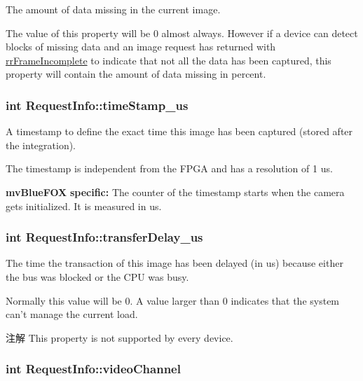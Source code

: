 The amount of data missing in the current image. 

The value of this property will be 0 almost always. However if a device can detect blocks of missing data and an image request has returned with \hyperlink{group___common_interface_ggab6148762ea638f8eabbabfc9468b0d4ca10d87665792fb666a20eda9b076c3164}{rr\+Frame\+Incomplete} to indicate that not all the data has been captured, this property will contain the amount of data missing in percent. \hypertarget{struct_request_info_a29fdb078f00559da9d860360b46d55de}{
\subsubsection[{time\+Stamp\+\_\+us}]{\setlength{\rightskip}{0pt plus 5cm}int Request\+Info\+::time\+Stamp\+\_\+us}}\label{struct_request_info_a29fdb078f00559da9d860360b46d55de}


A timestamp to define the exact time this image has been captured (stored after the integration). 

The timestamp is independent from the F\+P\+G\+A and has a resolution of 1 us.

{\bfseries mv\+Blue\+F\+O\+X} {\bfseries specific\+:} The counter of the timestamp starts when the camera gets initialized. It is measured in us. \hypertarget{struct_request_info_afcc4a35d0065f27e5ab6d90a4499e354}{
\subsubsection[{transfer\+Delay\+\_\+us}]{\setlength{\rightskip}{0pt plus 5cm}int Request\+Info\+::transfer\+Delay\+\_\+us}}\label{struct_request_info_afcc4a35d0065f27e5ab6d90a4499e354}


The time the transaction of this image has been delayed (in us) because either the bus was blocked or the C\+P\+U was busy. 

Normally this value will be 0. A value larger than 0 indicates that the system can't manage the current load.

\begin{DoxyNote}{注解}
This property is not supported by every device. 
\end{DoxyNote}
\hypertarget{struct_request_info_a47f673c91d2a9a31e5d38a6f33e297dd}{
\subsubsection[{video\+Channel}]{\setlength{\rightskip}{0pt plus 5cm}int Request\+Info\+::video\+Channel}}\label{struct_request_info_a47f673c91d2a9a31e5d38a6f33e297dd}


